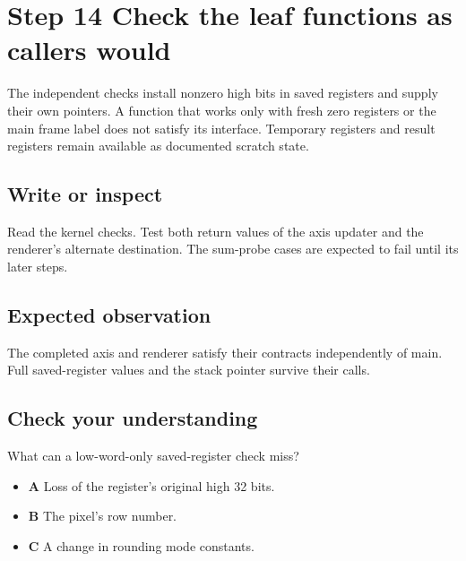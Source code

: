 \section{Step 14 Check the leaf functions as callers would}\label{ball-s14}

The independent checks install nonzero high bits in saved registers and supply their own pointers. A function that works only with fresh zero registers or the main frame label does not satisfy its interface. Temporary registers and result registers remain available as documented scratch state.

\subsection{Write or inspect}
Read the kernel checks. Test both return values of the axis updater and the renderer’s alternate destination. The sum-probe cases are expected to fail until its later steps.

\subsection{Expected observation}
The completed axis and renderer satisfy their contracts independently of main. Full saved-register values and the stack pointer survive their calls.

\subsection{Check your understanding}
What can a low-word-only saved-register check miss?

\begin{itemize}
  \item \textbf{A} Loss of the register’s original high 32 bits.
  \item \textbf{B} The pixel’s row number.
  \item \textbf{C} A change in rounding mode constants.
\end{itemize}
